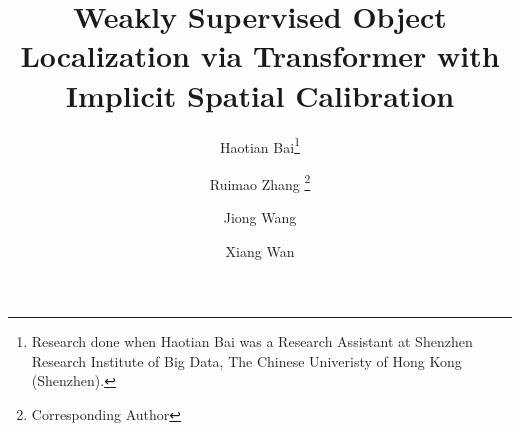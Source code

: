 \documentclass[runningheads]{llncs}
\begin{document}
\pagestyle{headings}
\mainmatter
\def\ECCVSubNumber{3632}  


\title{Weakly Supervised Object Localization via Transformer with Implicit Spatial Calibration}



\begin{comment}
\titlerunning{ECCV-22 submission ID \ECCVSubNumber} 
\authorrunning{ECCV-22 submission ID \ECCVSubNumber} 
\author{Anonymous ECCV submission}
\institute{Paper ID \ECCVSubNumber}
\end{comment}


\makeatletter
\renewcommand*{\@fnsymbol}[1]{\ifcase#1\or*\else\dag\fi}
\makeatother
\author{
Haotian Bai\thanks{Research done when Haotian Bai was a Research Assistant at Shenzhen Research Institute of Big Data, The Chinese Univeristy of Hong Kong
(Shenzhen). } \and
Ruimao Zhang \thanks{Corresponding Author}  \and
Jiong Wang \and
Xiang Wan 
}

\maketitle
\end{document}
